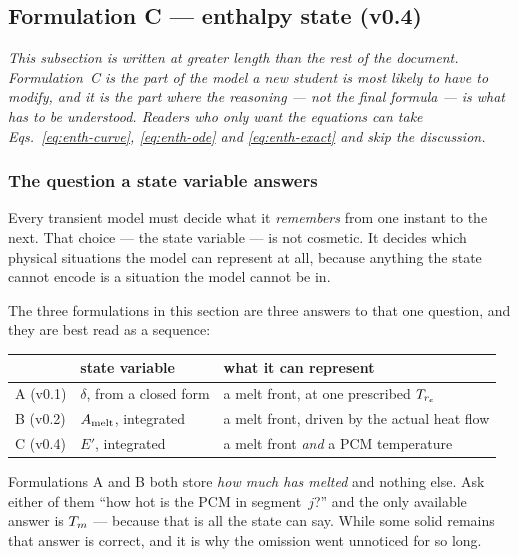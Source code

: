 \subsection{Formulation C --- enthalpy state (v0.4)}
\label{sec:front:enthalpy}

\emph{This subsection is written at greater length than the rest of the
document. Formulation~C is the part of the model a new student is most likely to
have to modify, and it is the part where the reasoning --- not the final
formula --- is what has to be understood. Readers who only want the equations
can take Eqs.~\eqref{eq:enth-curve}, \eqref{eq:enth-ode} and
\eqref{eq:enth-exact} and skip the discussion.}

\subsubsection{The question a state variable answers}

Every transient model must decide what it \emph{remembers} from one instant to
the next. That choice --- the state variable --- is not cosmetic. It decides
which physical situations the model can represent at all, because anything the
state cannot encode is a situation the model cannot be in.

The three formulations in this section are three answers to that one question,
and they are best read as a sequence:

\begin{center}
\begin{tabular}{@{}l l l@{}}
\toprule
 & state variable & what it can represent \\
\midrule
A (v0.1) & $\delta$, from a closed form & a melt front, at one prescribed $T_{r_{e}}$ \\
B (v0.2) & $A_{\mathrm{melt}}$, integrated & a melt front, driven by the actual heat flow \\
C (v0.4) & $E'$, integrated & a melt front \emph{and} a PCM temperature \\
\bottomrule
\end{tabular}
\end{center}

\noindent
Formulations A and B both store \emph{how much has melted} and nothing else.
Ask either of them ``how hot is the PCM in segment~$j$?'' and the only available
answer is $T_{m}$ --- because that is all the state can say. While some solid
remains that answer is correct, and it is why the omission went unnoticed for so
long.


